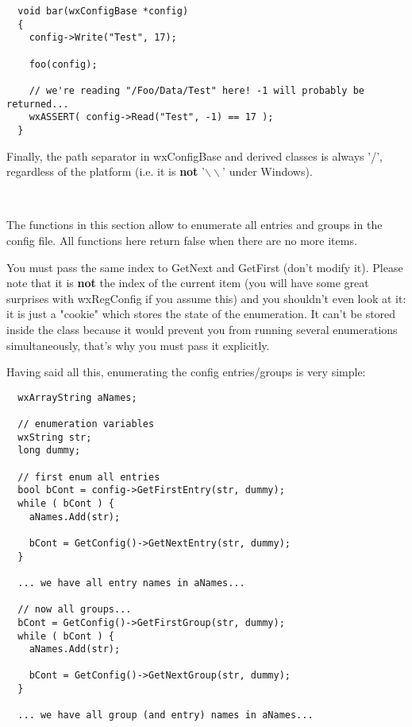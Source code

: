 \begin{verbatim}
  void bar(wxConfigBase *config)
  {
    config->Write("Test", 17);

    foo(config);

    // we're reading "/Foo/Data/Test" here! -1 will probably be returned...
    wxASSERT( config->Read("Test", -1) == 17 );
  }
\end{verbatim}

Finally, the path separator in wxConfigBase and derived classes is always '/',
regardless of the platform (i.e. it is {\bf not} '$\backslash\backslash$' under Windows).

\\


\label{configenumeration}

The functions in this section allow to enumerate all entries and groups in the
config file. All functions here return false when there are no more items.

You must pass the same index to GetNext and GetFirst (don't modify it).
Please note that it is {\bf not} the index of the current item (you will have
some great surprises with wxRegConfig if you assume this) and you shouldn't
even look at it: it is just a "cookie" which stores the state of the
enumeration. It can't be stored inside the class because it would prevent you
from running several enumerations simultaneously, that's why you must pass it
explicitly.

Having said all this, enumerating the config entries/groups is very simple:

\begin{verbatim}
  wxArrayString aNames;

  // enumeration variables
  wxString str;
  long dummy;

  // first enum all entries
  bool bCont = config->GetFirstEntry(str, dummy);
  while ( bCont ) {
    aNames.Add(str);

    bCont = GetConfig()->GetNextEntry(str, dummy);
  }

  ... we have all entry names in aNames...

  // now all groups...
  bCont = GetConfig()->GetFirstGroup(str, dummy);
  while ( bCont ) {
    aNames.Add(str);

    bCont = GetConfig()->GetNextGroup(str, dummy);
  }

  ... we have all group (and entry) names in aNames...

\end{verbatim}

